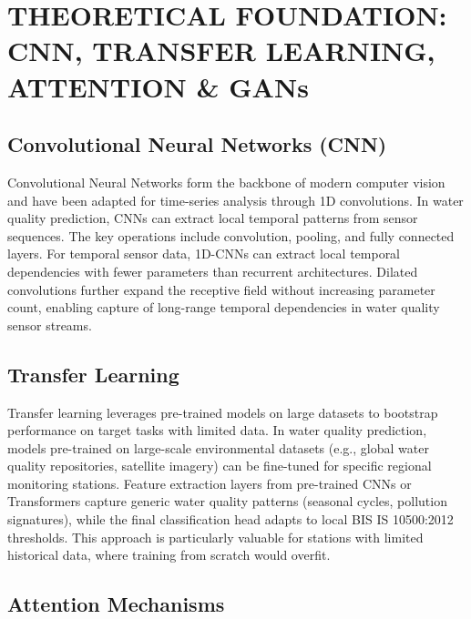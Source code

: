 \documentclass[12pt,a4paper]{report}
\numberwithin{table}{chapter}
\numberwithin{figure}{chapter}
\begin{document}
\chapter{THEORETICAL FOUNDATION: CNN, TRANSFER LEARNING, ATTENTION \& GANs}
\label{ch:theory}

\section{Convolutional Neural Networks (CNN)}

Convolutional Neural Networks form the backbone of modern computer vision and have been
adapted for time-series analysis through 1D convolutions. In water quality prediction,
CNNs can extract local temporal patterns from sensor sequences. The key operations
include convolution, pooling, and fully connected layers. For temporal sensor data,
1D-CNNs can extract local temporal dependencies with fewer parameters than recurrent
architectures. Dilated convolutions further expand the receptive field without
increasing parameter count, enabling capture of long-range temporal dependencies in
water quality sensor streams.

\section{Transfer Learning}

Transfer learning leverages pre-trained models on large datasets to bootstrap
performance on target tasks with limited data. In water quality prediction, models
pre-trained on large-scale environmental datasets (e.g., global water quality
repositories, satellite imagery) can be fine-tuned for specific regional monitoring
stations. Feature extraction layers from pre-trained CNNs or Transformers capture
generic water quality patterns (seasonal cycles, pollution signatures), while the
final classification head adapts to local BIS IS 10500:2012 thresholds. This approach
is particularly valuable for stations with limited historical data, where training
from scratch would overfit.

\section{Attention Mechanisms}
\end{document}

